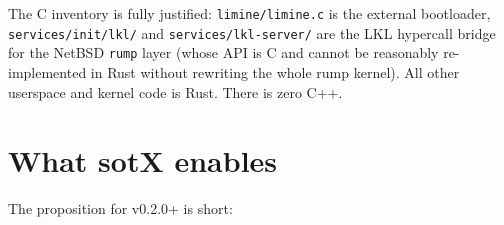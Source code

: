 \documentclass[11pt,a4paper]{article}
\begin{document}
The C inventory is fully justified: \texttt{limine/limine.c} is the
external bootloader, \texttt{services/init/lkl/} and
\texttt{services/lkl-server/} are the LKL hypercall bridge for the
NetBSD \texttt{rump} layer (whose API is C and cannot be reasonably
re-implemented in Rust without rewriting the whole rump kernel). All
other userspace and kernel code is Rust. There is zero C++.

\section{What sotX enables}

The proposition for v0.2.0+ is short:
\end{document}
